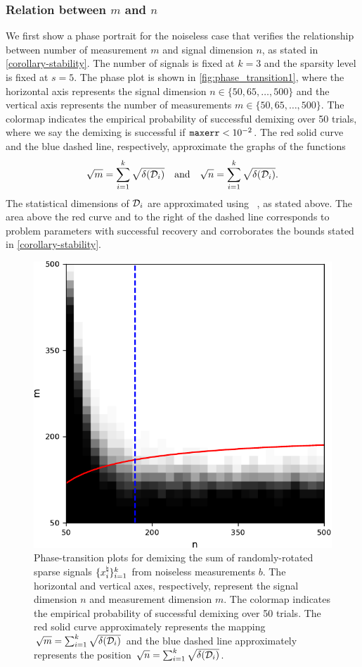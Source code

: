 \subsubsection{Relation between $m$ and $n$} \label{sec:phase_transition1}
We first show a phase portrait for the noiseless case that verifies the relationship between number of measurement $m$ and signal dimension $n$, as stated in \autoref{corollary-stability}. The number of signals is fixed at $k=3$ and the sparsity level is fixed at $s=5$. The phase plot is shown in \autoref{fig:phase_transition1}, where the horizontal axis represents the signal dimension $n\in\{50, 65, \dots, 500\}$ and the vertical axis represents the number of measurements $m\in\{50, 65, \dots, 500\}$. The colormap indicates the empirical probability of successful demixing over 50 trials, where we say the demixing is successful if $\mathop{\tt maxerr} < 10^{-2}$. The red solid curve and the blue dashed line, respectively, approximate the graphs of the functions
\[\sqrt{m} = \sum_{i=1}^k \sqrt{\delta(\mathcal{D}_i)}\hbox{\quad and\quad}\sqrt{n} = \sum_{i=1}^k \sqrt{\delta(\mathcal{D}_i)}.\]
The statistical dimensions of $\mathcal{D}_i$ are approximated using ~\citep[Proposition~4.5]{amelunxen2014living}, as stated above. The area above the red curve and to the right of the dashed line corresponds to problem parameters with successful recovery and corroborates the bounds stated in \autoref{corollary-stability}.

\begin{figure}[t]
    \centering
    \includegraphics[width=.5\linewidth]{./figures/relation_m_n.pdf}
    \caption{Phase-transition plots for demixing the sum of randomly-rotated sparse signals $\{x_i^{\natural}\}_{i=1}^k$ from noiseless measurements $b$. The horizontal and vertical axes, respectively, represent the signal dimension $n$ and measurement dimension $m$. The colormap indicates the empirical probability of successful demixing over 50 trials. The red solid curve approximately represents the mapping $\sqrt{m} = \sum_{i=1}^k \sqrt{\delta(\mathcal{D}_i)}$ and the blue dashed line approximately represents the position $\sqrt{n} = \sum_{i=1}^k \sqrt{\delta(\mathcal{D}_i)}$.}
    \label{fig:phase_transition1}
\end{figure}

